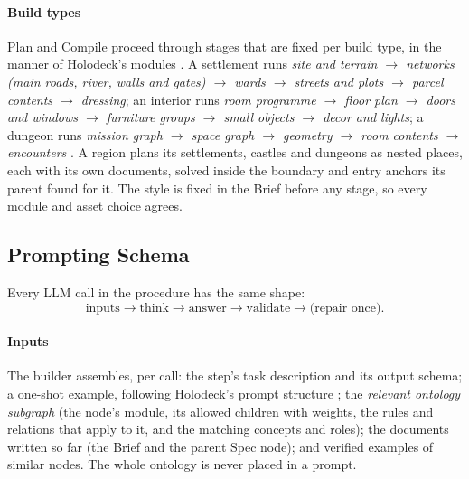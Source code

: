\documentclass[conference]{IEEEtran}
\begin{document}
\paragraph{Build types} Plan and Compile proceed through stages that are fixed per build
type, in the manner of Holodeck's modules \cite{holodeck}. A settlement runs \emph{site
and terrain $\rightarrow$ networks (main roads, river, walls and gates) $\rightarrow$
wards $\rightarrow$ streets and plots $\rightarrow$ parcel contents $\rightarrow$
dressing}; an interior runs \emph{room programme $\rightarrow$ floor plan $\rightarrow$
doors and windows $\rightarrow$ furniture groups $\rightarrow$ small objects $\rightarrow$
decor and lights}; a dungeon runs \emph{mission graph $\rightarrow$ space graph
$\rightarrow$ geometry $\rightarrow$ room contents $\rightarrow$ encounters}
\cite{dormans2010}. A region plans its settlements, castles and dungeons as nested places,
each with its own documents, solved inside the boundary and entry anchors its parent
found for it. The style is fixed in the Brief before any stage, so every module and
asset choice agrees.

\subsection{Prompting Schema}

Every LLM call in the procedure has the same shape:
\begin{equation*}
\text{inputs} \rightarrow \text{think} \rightarrow \text{answer} \rightarrow
\text{validate} \rightarrow \text{(repair once)}.
\end{equation*}

\paragraph{Inputs} The builder assembles, per call: the step's task description and its
output schema; a one-shot example, following Holodeck's prompt structure \cite{holodeck};
the \emph{relevant ontology subgraph} (the node's module, its allowed children with
weights, the rules and relations that apply to it, and the matching concepts and roles);
the documents written so far (the Brief and the parent Spec node); and verified examples
of similar nodes. The whole ontology is never placed in a prompt.
\end{document}
